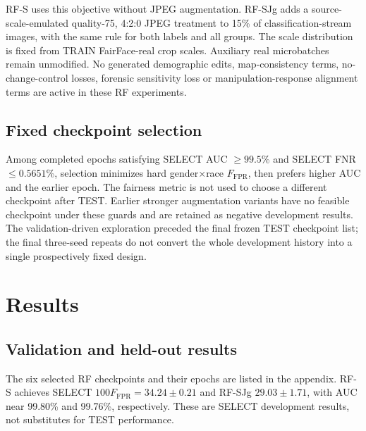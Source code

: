 \documentclass[10pt,twocolumn,letterpaper]{article}
\newcommand{\ffpr}{F_{\mathrm{FPR}}}
\begin{document}
RF-S uses this objective without JPEG augmentation. RF-SJg adds a source-scale-emulated quality-75, 4:2:0
JPEG treatment to 15\% of classification-stream images, with the same rule for both labels and all groups.
The scale distribution is fixed from TRAIN FairFace-real crop scales. Auxiliary real microbatches remain
unmodified. No generated demographic edits, map-consistency terms, no-change-control losses, forensic
sensitivity loss or manipulation-response alignment terms are active in these RF experiments.

\subsection{Fixed checkpoint selection}
Among completed epochs satisfying SELECT AUC $\ge99.5$\% and SELECT FNR $\le0.5651$\%, selection minimizes
hard gender$\times$race $\ffpr$, then prefers higher AUC and the earlier epoch. The fairness metric is
not used to choose a different checkpoint after TEST.
Earlier stronger augmentation variants have no feasible checkpoint under these guards and are retained as
negative development results. The validation-driven exploration preceded the final frozen TEST checkpoint list;
the final three-seed repeats do not convert the whole development history into a single prospectively fixed design.

\section{Results}
\subsection{Validation and held-out results}
The six selected RF checkpoints and their epochs are listed in the appendix. RF-S achieves
SELECT $100\ffpr=34.24\pm0.21$ and RF-SJg $29.03\pm1.71$, with AUC near 99.80\% and 99.76\%, respectively.
These are SELECT development results, not substitutes for TEST performance.

\begin{table}[t]
\centering\small

\caption{Existing frozen FairForge-2 TEST evaluation, gender$\times$race axis. Rates and AUC are multiplied by 100;
$100\ffpr$ is a summed disparity. $n$ counts downstream seeds. $\pm$ is sample SD, not a confidence interval.
$\dagger$ marks local comparator implementations with distinct training/selection budgets; corrected GDA is
not the original published Ding result. Worst-group AUC uses eight eligible groups.}
\label{tab:test}
\end{table}
\end{document}

